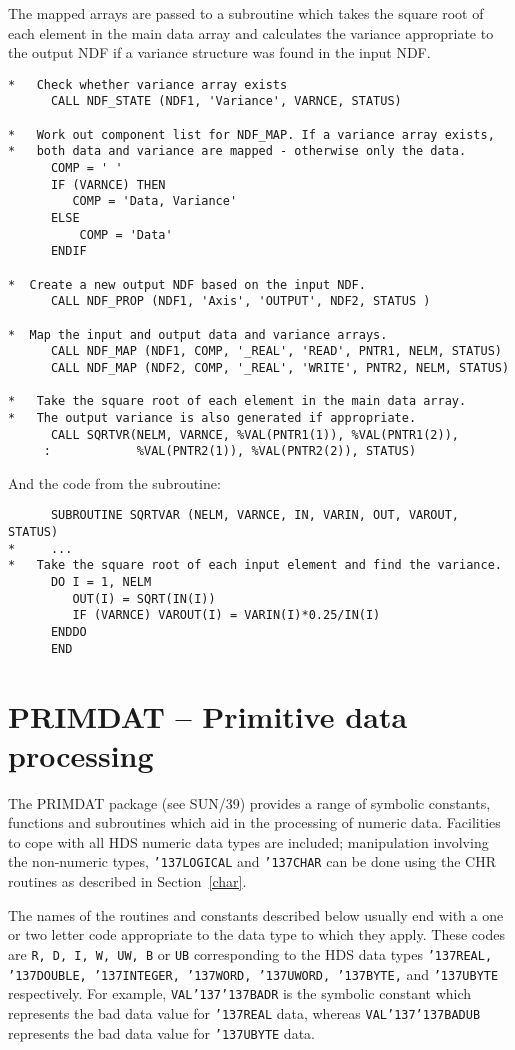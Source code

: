 \documentclass[twoside,11pt]{article}
\renewcommand{\_}{{\tt\char'137}}
\newcommand{\xref}[3]{#1}
\newcommand{\xlabel}[1]{}
\begin{document}
The mapped arrays are passed to a subroutine which takes the square root of
each element in the main data array and calculates the variance appropriate
to the output NDF if a variance structure was found  in the input NDF.
\begin{verbatim}
*   Check whether variance array exists
      CALL NDF_STATE (NDF1, 'Variance', VARNCE, STATUS)

*   Work out component list for NDF_MAP. If a variance array exists, 
*   both data and variance are mapped - otherwise only the data.
      COMP = ' '
      IF (VARNCE) THEN
         COMP = 'Data, Variance'
      ELSE
          COMP = 'Data'
      ENDIF

*  Create a new output NDF based on the input NDF. 
      CALL NDF_PROP (NDF1, 'Axis', 'OUTPUT', NDF2, STATUS )

*  Map the input and output data and variance arrays.
      CALL NDF_MAP (NDF1, COMP, '_REAL', 'READ', PNTR1, NELM, STATUS)
      CALL NDF_MAP (NDF2, COMP, '_REAL', 'WRITE', PNTR2, NELM, STATUS)

*   Take the square root of each element in the main data array.
*   The output variance is also generated if appropriate.
      CALL SQRTVR(NELM, VARNCE, %VAL(PNTR1(1)), %VAL(PNTR1(2)), 
     :            %VAL(PNTR2(1)), %VAL(PNTR2(2)), STATUS)
\end{verbatim}
And the code from the subroutine:
\begin{verbatim}
      SUBROUTINE SQRTVAR (NELM, VARNCE, IN, VARIN, OUT, VAROUT, STATUS)
*     ...
*   Take the square root of each input element and find the variance.
      DO I = 1, NELM
         OUT(I) = SQRT(IN(I))
         IF (VARNCE) VAROUT(I) = VARIN(I)*0.25/IN(I)
      ENDDO
      END
\end{verbatim}

\newpage
\section{PRIMDAT -- Primitive data processing\label{prim}\xlabel{primdat}}

The PRIMDAT package (see \xref{SUN/39}{sun39}{}) provides a range of symbolic
constants, functions and subroutines which aid in the processing of numeric
data. 
Facilities to cope with all HDS numeric data types 
are included;
manipulation involving the non-numeric types, {\tt \_LOGICAL} and {\tt\_CHAR}
can be done using the CHR routines as described in Section~\ref{char}.

The names of the routines and constants described below usually end with a
one or two letter code appropriate to the data type to which they apply.
These codes are {\tt R, D, I, W, UW, B} or {\tt UB}  corresponding to the 
HDS data types {\tt \_REAL,
\_DOUBLE, \_INTEGER, \_WORD, \_UWORD, \_BYTE,} and {\tt\_UBYTE} respectively.
For example, {\tt VAL\_\_BADR} is the symbolic constant which represents the bad
data value for  {\tt\_REAL} data, whereas {\tt VAL\_\_BADUB} represents the bad
data value for {\tt\_UBYTE} data. 
\end{document}
